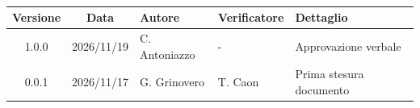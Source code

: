 \\[0.5cm]

\renewcommand{\arraystretch}{1.3}
\noindent\begin{tabularx}{\textwidth}{|c|c|>{\raggedright\arraybackslash}p{2.8cm}|>{\raggedright\arraybackslash}p{2.8cm}|X|}
    \hline
    \textbf{Versione} & \textbf{Data} & \textbf{Autore} & \textbf{Verificatore} & \textbf{Dettaglio} \\
    \hline
    1.0.0 & 2026/11/19 & C. Antoniazzo & - & Approvazione verbale \\
    \hline
    0.0.1 & 2026/11/17 & G. Grinovero & T. Caon & Prima stesura documento \\
    \hline
\end{tabularx}
\newpage
